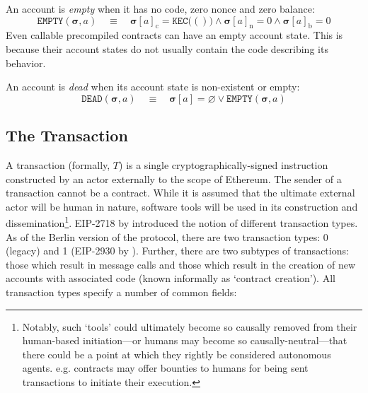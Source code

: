 \documentclass[9pt,oneside]{amsart}
\makeatletter
\newcommand*\eg{e.g.\@\xspace}
\makeatother
\begin{document}
\begin{multicols}{2}
An account is \textit{empty} when it has no code, zero nonce and zero balance:
\begin{equation}
\mathtt{EMPTY}(\boldsymbol{\sigma}, a) \quad\equiv\quad \boldsymbol{\sigma}[a]_{\mathrm{c}} = \texttt{KEC}\big(()\big) \wedge \boldsymbol{\sigma}[a]_{\mathrm{n}} = 0 \wedge \boldsymbol{\sigma}[a]_{\mathrm{b}} = 0
\end{equation}
Even callable precompiled contracts can have an empty account state. This is because their account states do not usually contain the code describing its behavior.

An account is \textit{dead} when its account state is non-existent or empty:
\begin{equation}
\mathtt{DEAD}(\boldsymbol{\sigma}, a) \quad\equiv\quad \boldsymbol{\sigma}[a] = \varnothing \vee \mathtt{EMPTY}(\boldsymbol{\sigma}, a)
\end{equation}

\subsection{The Transaction} \label{subsec:transaction}

A transaction (formally, $T$) is a single cryptographically-signed instruction constructed by an actor externally to the scope of Ethereum.
The sender of a transaction cannot be a contract.
While it is assumed that the ultimate external actor will be human in nature, software tools will be used in its construction and dissemination\footnote{Notably,
such `tools' could ultimately become so causally removed from their human-based initiation---or humans may become so causally-neutral---that there could be a point at which they rightly be considered autonomous agents.
\eg contracts may offer bounties to humans for being sent transactions to initiate their execution.}.
EIP-2718 by \cite{EIP-2718} introduced the notion of different transaction types.
As of the Berlin version of the protocol, there are two transaction types: 0 (legacy) and 1 (EIP-2930 by \cite{EIP-2930}).
Further, there are two subtypes of transactions: those which result in message calls and those which result in the creation of new accounts with associated code (known informally as `contract creation').
All transaction types specify a number of common fields:


\end{multicols}
\end{document}
